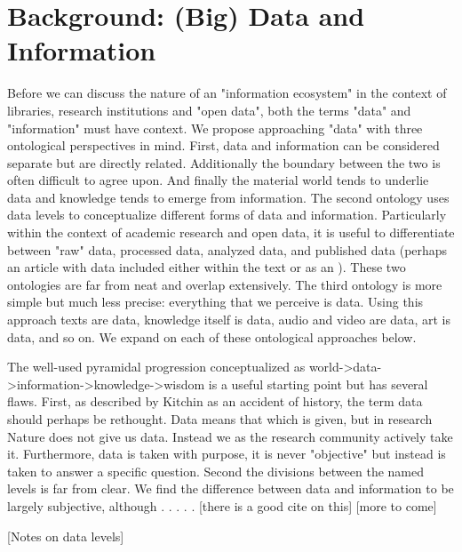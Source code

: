 \section{Background: (Big) Data and Information}

Before we can discuss the nature of an "information ecosystem" in the context of libraries, research institutions and "open data", both the terms "data" and "information" must have context. We propose approaching "data" with three ontological perspectives in mind. First, data and information can be considered separate but are directly related. Additionally the boundary between the two is often difficult to agree upon. And finally the material world tends to underlie data and knowledge tends to emerge from information. The second ontology uses data levels to conceptualize different forms of data and information. Particularly within the context of academic research and open data, it is useful to differentiate between "raw" data, processed data, analyzed data, and published data (perhaps an article with data included either within the text or as an ). These two ontologies are far from neat and overlap extensively. The third ontology is more simple but much less precise: everything that we perceive is data. Using this approach texts are data, knowledge itself is data, audio and video are data, art is data, and so on. We expand on each of these ontological approaches below.

The well-used pyramidal progression conceptualized as world->data->information->knowledge->wisdom is a useful starting point but has several flaws. First, as described by Kitchin as an accident of history, the term data should perhaps be rethought. Data means that which is given, but in research Nature does not give us data. Instead we as the research community actively take it. Furthermore, data is taken with purpose, it is never "objective" but instead is taken to answer a specific question. Second the divisions between the named levels is far from clear. We find the difference between data and information to be largely subjective, although  . . . . . [there is a good cite on this] [more to come]

[Notes on data levels]